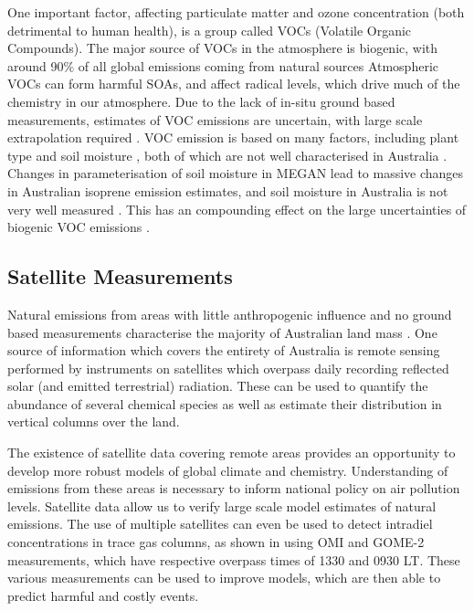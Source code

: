     One important factor, affecting particulate matter and ozone concentration (both detrimental to human health), is a group called VOCs (Volatile Organic Compounds).
    The major source of VOCs in the atmosphere is biogenic, with around 90\% of all global emissions coming from natural sources \citep{Guenther1995,Guenther2006, Millet2006}
    Atmospheric VOCs can form harmful SOAs, and affect radical levels, which drive much of the chemistry in our atmosphere.
    Due to the lack of in-situ ground based measurements, estimates of VOC emissions are uncertain, with large scale extrapolation required \citet{Millet2006}.
    VOC emission is based on many factors, including plant type and soil moisture \citep{Guenther1995}, both of which are not well characterised in Australia \citep{Sindelarova2014, Bauwens2016}.
    Changes in parameterisation of soil moisture in MEGAN lead to massive changes in Australian isoprene emission estimates, and soil moisture in Australia is not very well measured \citep{Sindelarova2014}.
    This has an compounding effect on the large uncertainties of biogenic VOC emissions \citep{Guenther2000, Millet2006}.

  \subsection{Satellite Measurements}

    Natural emissions from areas with little anthropogenic influence and no ground based measurements characterise the majority of Australian land mass \citep{VanDerA2008}.
    One source of information which covers the entirety of Australia is remote sensing performed by instruments on satellites which overpass daily recording reflected solar (and emitted terrestrial) radiation.
    These can be used to quantify the abundance of several chemical species as well as estimate their distribution in vertical columns over the land.

    The existence of satellite data covering remote areas provides an opportunity to develop more robust models of global climate and chemistry.
    Understanding of emissions from these areas is necessary to inform national policy on air pollution levels.
    Satellite data allow us to verify large scale model estimates of natural emissions.
    The use of multiple satellites can even be used to detect intradiel concentrations in trace gas columns, as shown in \cite{Stavrakou2015} using OMI and GOME-2 measurements, which have respective overpass times of 1330 and 0930 LT.
    These various measurements can be used to improve models, which are then able to predict harmful and costly events.
    
